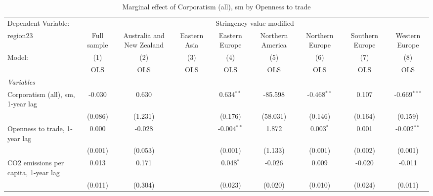 
\begin{table}[htbp]
   \caption{Marginal effect of Corporatism (all), sm by Openness to trade}
   \centering
   \begin{tabular}{lcccccccc}
      \toprule
      Dependent Variable: & \multicolumn{8}{c}{Stringency value modified}\\
      region23                                                          & Full sample   & Australia and New Zealand & Eastern Asia & Eastern Europe & Northern America & Northern Europe & Southern Europe & Western Europe \\   
      Model:                                                            & (1)           & (2)                       & (3)          & (4)            & (5)              & (6)             & (7)             & (8)\\  
                                                                        &  OLS          & OLS                       & OLS          & OLS            & OLS              & OLS             & OLS             & OLS\\  
      \midrule
      \emph{Variables}\\
      Corporatism (all), sm, 1-year lag                                 & -0.030        & 0.630                     &              & 0.634$^{**}$   & -85.598          & -0.468$^{**}$   & 0.107           & -0.669$^{***}$\\   
                                                                        & (0.086)       & (1.231)                   &              & (0.176)        & (58.031)         & (0.146)         & (0.164)         & (0.159)\\   
      Openness to trade, 1-year lag                                     & 0.000         & -0.028                    &              & -0.004$^{**}$  & 1.872            & 0.003$^{*}$     & 0.001           & -0.002$^{**}$\\   
                                                                        & (0.001)       & (0.053)                   &              & (0.001)        & (1.133)          & (0.001)         & (0.002)         & (0.001)\\   
      CO2 emissions per capita, 1-year lag                              & 0.013         & 0.171                     &              & 0.048$^{*}$    & -0.026           & 0.009           & -0.020          & -0.011\\   
                                                                        & (0.011)       & (0.304)                   &              & (0.023)        & (0.020)          & (0.010)         & (0.024)         & (0.011)\\   

\end{tabular}
\end{table}
